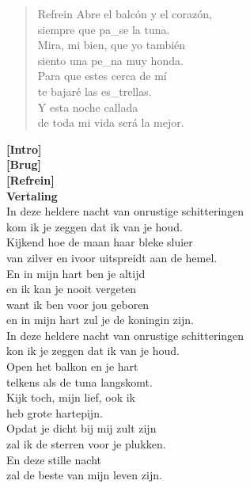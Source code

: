 \begin{verse}{Refrein}
Abre el balc\'{o}n y el coraz\'{o}n,\\
siempre que pa\_se \hspace{1em}\hspace{1em} la tuna.\\
\chord{}Mira, mi bien, que yo tambi\'{e}n\\
siento una pe\_na \hspace{1em}\hspace{1em} muy honda.\\
\chord{}Para que estes cerca de m\'{i}\\
te bajar\'{e} las es\_trellas.\\
Y esta noche callada\\
de toda mi vida ser\'{a} la mejor.\hspace{4em} \\
\end{verse}

\textbf{[Intro]}\\
\textbf{[Brug]}\\
\textbf{[Refrein]}\\
\vspace{10em}
\textbf{Vertaling}\\
In deze heldere nacht van onrustige schitteringen\\
kom ik je zeggen dat ik van je houd.\\
Kijkend hoe de maan haar bleke sluier\\
van zilver en ivoor uitspreidt aan de hemel.\\\vspace{1em}
En in mijn hart ben je altijd\\
en ik kan je nooit vergeten\\
want ik ben voor jou geboren\\
en in mijn hart zul je de koningin zijn.\\\vspace{1em}
In deze heldere nacht van onrustige schitteringen\\
kon ik je zeggen dat ik van je houd.\\\vspace{1em}
Open het balkon en je hart\\
telkens als de tuna langskomt.\\
Kijk toch, mijn lief, ook ik\\
heb grote hartepijn.\\
Opdat je dicht bij mij zult zijn\\
zal ik de sterren voor je plukken.\\
En deze stille nacht\\
zal de beste van mijn leven zijn.\\

